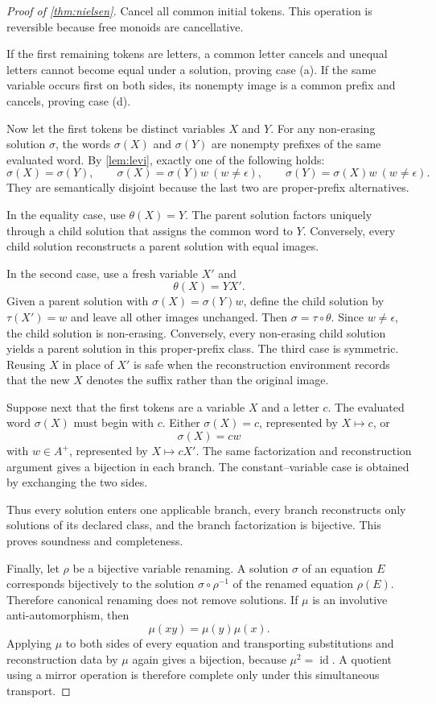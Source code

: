 \documentclass[11pt]{article}
\newcommand{\id}{\operatorname{id}}
\begin{document}
\begin{proof}[Proof of \cref{thm:nielsen}]
Cancel all common initial tokens. This operation is reversible because free monoids are cancellative.

If the first remaining tokens are letters, a common letter cancels and unequal letters cannot become equal under a solution, proving case (a). If the same variable occurs first on both sides, its nonempty image is a common prefix and cancels, proving case (d).

Now let the first tokens be distinct variables $X$ and $Y$. For any non-erasing solution $\sigma$, the words $\sigma(X)$ and $\sigma(Y)$ are nonempty prefixes of the same evaluated word. By \cref{lem:levi}, exactly one of the following holds:
\[
\sigma(X)=\sigma(Y),\qquad
\sigma(X)=\sigma(Y)w\ (w\ne\epsilon),\qquad
\sigma(Y)=\sigma(X)w\ (w\ne\epsilon).
\]
They are semantically disjoint because the last two are proper-prefix alternatives.

In the equality case, use $\theta(X)=Y$. The parent solution factors uniquely through a child solution that assigns the common word to $Y$. Conversely, every child solution reconstructs a parent solution with equal images.

In the second case, use a fresh variable $X'$ and
\[
  \theta(X)=YX'.
\]
Given a parent solution with $\sigma(X)=\sigma(Y)w$, define the child solution by $\tau(X')=w$ and leave all other images unchanged. Then $\sigma=\tau\circ\theta$. Since $w\ne\epsilon$, the child solution is non-erasing. Conversely, every non-erasing child solution yields a parent solution in this proper-prefix class. The third case is symmetric. Reusing $X$ in place of $X'$ is safe when the reconstruction environment records that the new $X$ denotes the suffix rather than the original image.

Suppose next that the first tokens are a variable $X$ and a letter $c$. The evaluated word $\sigma(X)$ must begin with $c$. Either $\sigma(X)=c$, represented by $X\mapsto c$, or
\[
  \sigma(X)=cw
\]
with $w\in A^+$, represented by $X\mapsto cX'$. The same factorization and reconstruction argument gives a bijection in each branch. The constant--variable case is obtained by exchanging the two sides.

Thus every solution enters one applicable branch, every branch reconstructs only solutions of its declared class, and the branch factorization is bijective. This proves soundness and completeness.

Finally, let $\rho$ be a bijective variable renaming. A solution $\sigma$ of an equation $E$ corresponds bijectively to the solution $\sigma\circ\rho^{-1}$ of the renamed equation $\rho(E)$. Therefore canonical renaming does not remove solutions. If $\mu$ is an involutive anti-automorphism, then
\[
  \mu(xy)=\mu(y)\mu(x).
\]
Applying $\mu$ to both sides of every equation and transporting substitutions and reconstruction data by $\mu$ again gives a bijection, because $\mu^2=\id$. A quotient using a mirror operation is therefore complete only under this simultaneous transport.
\end{proof}
\end{document}
